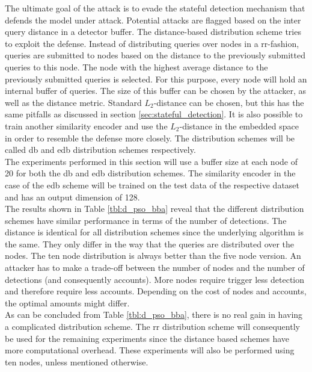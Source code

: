 The ultimate goal of the attack is to evade the stateful detection mechanism that defends the model under attack. Potential attacks are flagged based on the inter query distance in a detector buffer. The distance-based distribution scheme tries to exploit the defense. Instead of distributing queries over nodes in a \gls{rr}-fashion, queries are submitted to nodes based on the distance to the previously submitted queries to this node. The node with the highest average distance to the previously submitted queries is selected. For this purpose, every node will hold an internal buffer of queries. The size of this buffer can be chosen by the attacker, as well as the distance metric. Standard $L_2$-distance can be chosen, but this has the same pitfalls as discussed in section \ref{sec:stateful_detection}. It is also possible to train another similarity encoder and use the $L_2$-distance in the embedded space in order to resemble the defense more closely. The distribution schemes will be called \gls{db} and \gls{edb} distribution schemes respectively.\\

The experiments performed in this section will use a buffer size at each node of 20 for both the \gls{db} and \gls{edb} distribution schemes. The similarity encoder in the case of the \gls{edb} scheme will be trained on the test data of the respective dataset and has an output dimension of 128.\\

The results shown in Table \ref{tbl:d_pso_bba} reveal that the different distribution schemes have similar performance in terms of the number of detections. The distance is identical for all distribution schemes since the underlying algorithm is the same. They only differ in the way that the queries are distributed over the nodes. The ten node distribution is always better than the five node version. An attacker has to make a trade-off between the number of nodes and the number of detections (and consequently accounts). More nodes require trigger less detection and therefore require less accounts. Depending on the cost of nodes and accounts, the optimal amounts might differ.\\

As can be concluded from Table \ref{tbl:d_pso_bba}, there is no real gain in having a complicated distribution scheme. The \gls{rr} distribution scheme will consequently be used for the remaining experiments since the distance based schemes have more computational overhead. These experiments will also be performed using ten nodes, unless mentioned otherwise.\\


